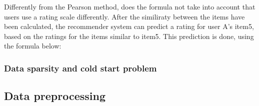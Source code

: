 Differently from the Pearson method, does the formula not take into account that users use a rating scale differently. 
After the similiraty between the items have been calculated, the recommender system can predict a rating for user A's item5, based on the ratings for the items similar to item5. This prediction is done, using the formula below:

\subsubsection{Data sparsity and cold start problem}
\subsection{Data preprocessing} %
\label{sub:data_preprocessing}


